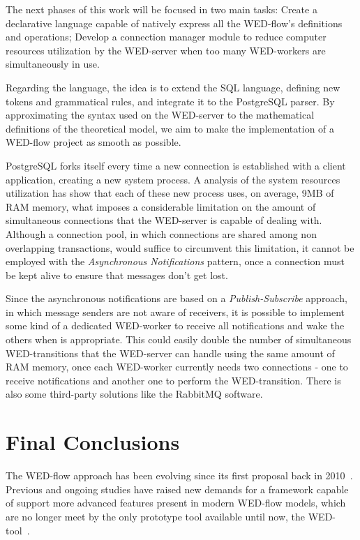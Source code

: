 \documentclass[12pt]{article}
\begin{document}
The next phases of this work will be focused in two main tasks: Create a declarative language capable of natively express all
the WED-flow's definitions and operations; Develop a connection manager module to reduce computer resources utilization
by the WED-server when too many WED-workers are simultaneously in use.    

Regarding the language, the idea is to extend the SQL language, defining new tokens and grammatical rules, and integrate it
to the PostgreSQL parser. By approximating the syntax used on the WED-server to the mathematical definitions of the theoretical 
model, we aim to make the implementation of a WED-flow project as smooth as possible. 

PostgreSQL forks itself every time a new connection is established with a client application, creating a new system process.
A analysis of the system resources utilization has show that each of these new process uses, on average, 9MB of RAM memory,
what imposes a considerable limitation on the amount of simultaneous connections that the WED-server is capable of dealing with.
Although a connection pool, in which connections are shared among non overlapping transactions, would
suffice to circumvent this limitation, it cannot be employed with the \emph{Asynchronous Notifications} pattern, once a connection
must be kept alive to ensure that messages don't get lost.

Since the asynchronous notifications are based on a \emph{Publish-Subscribe} approach, in which message senders are not
aware of receivers, it is possible to implement some kind of a dedicated WED-worker to receive all notifications and wake
the others when is appropriate. This could easily double the number of simultaneous WED-transitions that the WED-server
can handle using the same amount of RAM memory, once each WED-worker currently needs two connections - one to receive notifications
and another one to perform the WED-transition. There is also some third-party solutions like the RabbitMQ software.


\section{Final Conclusions}

The WED-flow approach has been evolving since its first proposal back in 2010~\cite{FTPM10}. Previous and ongoing studies
have raised new demands for a framework capable of support more advanced features present in modern WED-flow models, which
are no longer meet by the only prototype tool available until now, the WED-tool~\cite{WT}. 
\end{document}
